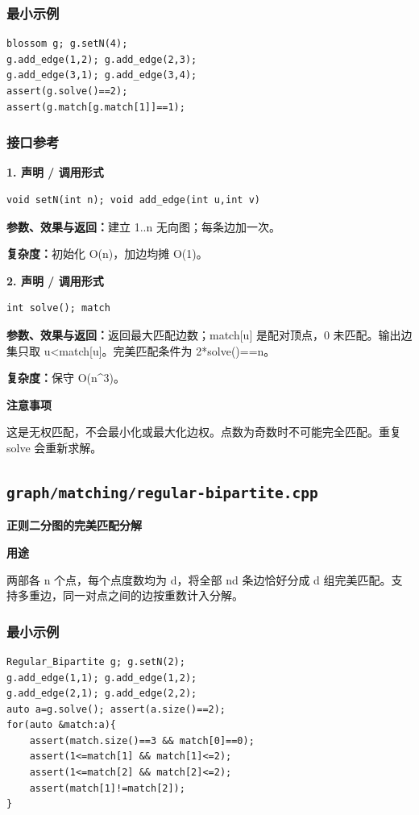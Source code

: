 \documentclass[UTF8,a4paper,10pt]{ctexart}
\newcommand{\TemplUsage}[1]{\textbf{用途}\par #1\par}
\newcommand{\TemplNote}[1]{\textbf{注意事项}\par #1\par}
\begin{document}
\subsubsection*{最小示例}
\begin{lstlisting}
blossom g; g.setN(4);
g.add_edge(1,2); g.add_edge(2,3);
g.add_edge(3,1); g.add_edge(3,4);
assert(g.solve()==2);
assert(g.match[g.match[1]]==1);
\end{lstlisting}
\subsubsection*{接口参考}
\noindent\begin{minipage}{\textwidth}
\textbf{1. 声明 / 调用形式}
\begin{lstlisting}
void setN(int n); void add_edge(int u,int v)
\end{lstlisting}
\textbf{参数、效果与返回：}建立 1..n 无向图；每条边加一次。

\textbf{复杂度：}初始化 O(n)，加边均摊 O(1)。

\end{minipage}\par\vspace{0.4em}
\noindent\begin{minipage}{\textwidth}
\textbf{2. 声明 / 调用形式}
\begin{lstlisting}
int solve(); match
\end{lstlisting}
\textbf{参数、效果与返回：}返回最大匹配边数；match[u] 是配对顶点，0 未匹配。输出边集只取 u<match[u]。完美匹配条件为 2*solve()==n。

\textbf{复杂度：}保守 O(n\textasciicircum{}3)。

\TemplNote{这是无权匹配，不会最小化或最大化边权。点数为奇数时不可能完全匹配。重复 solve 会重新求解。}
\end{minipage}\par\vspace{0.4em}
\clearpage
\subsection{\texttt{graph/matching/regular-bipartite.cpp}}
\textbf{正则二分图的完美匹配分解}\par
\TemplUsage{两部各 n 个点，每个点度数均为 d，将全部 nd 条边恰好分成 d 组完美匹配。支持多重边，同一对点之间的边按重数计入分解。}
\subsubsection*{最小示例}
\begin{lstlisting}
Regular_Bipartite g; g.setN(2);
g.add_edge(1,1); g.add_edge(1,2);
g.add_edge(2,1); g.add_edge(2,2);
auto a=g.solve(); assert(a.size()==2);
for(auto &match:a){
    assert(match.size()==3 && match[0]==0);
    assert(1<=match[1] && match[1]<=2);
    assert(1<=match[2] && match[2]<=2);
    assert(match[1]!=match[2]);
}
\end{lstlisting}
\end{document}
